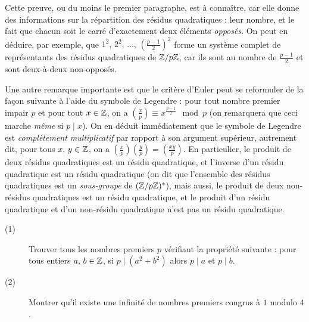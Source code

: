 \medskip

Cette preuve, ou du moins le premier paragraphe, est \`a conna\^itre, car elle donne des informations sur la r\'epartition des r\'esidus quadratiques : leur nombre, et le fait que chacun soit le carr\'e d'exactement deux \'el\'ements \textit{oppos\'es}. On peut en d\'eduire, par exemple, que $1^2, \, 2^2, \, ..., \, \left (\frac{p - 1}{2} \right)^2$ forme un syst\`eme complet de repr\'esentants des r\'esidus quadratiques de $\mathbb Z / p\mathbb Z$, car ils sont au nombre de $\frac{p - 1}{2}$ et sont deux-\`a-deux non-oppos\'es.

\smallskip

Une autre remarque importante est que le crit\`ere d'Euler peut se reformuler de la fa\c con suivante \`a l'aide du symbole de Legendre : pour tout nombre premier impair $p$ et pour tout $x \in \mathbb Z$, on a $\displaystyle \left (\frac{x}{p} \right) \equiv x^{\frac{p - 1}{2}} \mod p$ (on remarquera que ceci marche \textit{m\^eme} si $p \mid x$). On en d\'eduit imm\'ediatement que le symbole de Legendre est \textit{compl\`etement multiplicatif} par rapport \`a son argument sup\'erieur, autrement dit, pour tous $x, \, y \in \mathbb Z$, on a $\displaystyle \left (\frac{x}{p} \right)\displaystyle \left (\frac{y}{p} \right) = \displaystyle \left (\frac{xy}{p} \right)$. En particulier, le produit de deux r\'esidus quadratiques est un r\'esidu quadratique, et l'inverse d'un r\'esidu quadratique est un r\'esidu quadratique (on dit que l'ensemble des r\'esidus quadratiques est un \textit{sous-groupe} de $(\mathbb Z/p\mathbb Z)^*$), mais aussi, le produit de deux non-r\'esidus quadratiques est un r\'esidu quadratique, et le produit d'un r\'esidu quadratique et d'un non-r\'esidu quadratique n'est pas un r\'esidu quadratique.

\bigskip

\begin{exo}

\begin{description}

\item[(1)]Trouver tous les nombres premiers $p$ v\'erifiant la propri\'et\'e suivante : pour tous entiers $a, \, b \in \mathbb Z$, si $p \mid (a^2 + b^2)$ alors $p \mid a$ et $p \mid b$.

\item[(2)]Montrer qu'il existe une infinit\'e de nombres premiers congrus \`a $1$ modulo $4$.

\end{description}

\end{exo}

